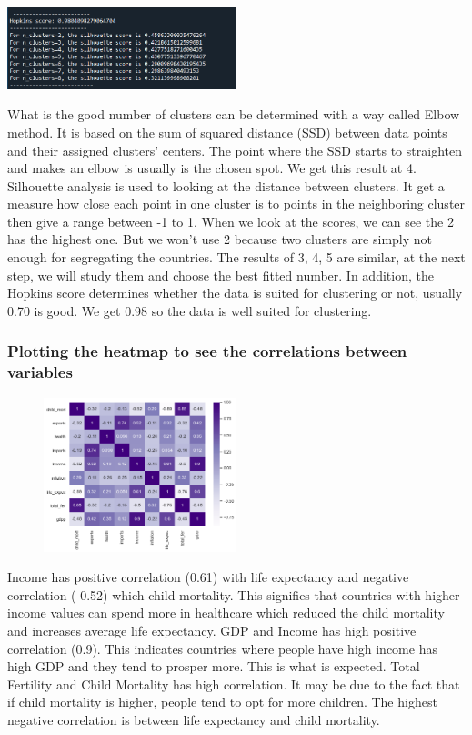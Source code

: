 \documentclass[onecolumn]{article}
\begin{document}
\begin{center}
    \includegraphics[width=0.50\textwidth]{sil.png}
\end{center}
What is the good number of clusters can be determined with a way called Elbow method. It is based on the sum of squared distance (SSD) between data points and their assigned clusters' centers. The point where the SSD starts to straighten and makes an elbow is usually is the chosen spot. We get this result at 4.
Silhouette analysis is used to looking at the distance between clusters. It get a measure how close each point in one cluster is to points in the neighboring cluster then give a range between -1 to 1.
When we look at the scores, we can see the 2 has the highest one. But we won't use 2 because two clusters are simply not enough for segregating the countries. The results of 3, 4, 5 are similar, at the next step, we will study them and choose the best fitted number. In addition, the Hopkins score determines whether the data is suited for clustering or not, usually 0.70 is good. We get 0.98 so the data is well suited for clustering.

\subsubsection{Plotting the heatmap to see the correlations between variables}

\begin{figure} 
    \vspace{\dimexpr0.05\baselineskip-\topskip}%
    \centering
    \includegraphics[width=0.50\textwidth]{heatmap.png}
\end{figure}

Income has positive correlation (0.61) with life expectancy and negative correlation (-0.52) which child mortality. This signifies that countries with higher income values can spend more in healthcare which reduced the child mortality and increases average life expectancy.
GDP and Income has high positive correlation (0.9). This indicates countries where people have high income has high GDP and they tend to prosper more. This is what is expected.
Total Fertility and Child Mortality has high correlation. It may be due to the fact that if child mortality is higher, people tend to opt for more children.
The highest negative correlation is between life expectancy and child mortality.
\normalsize
\end{document}
